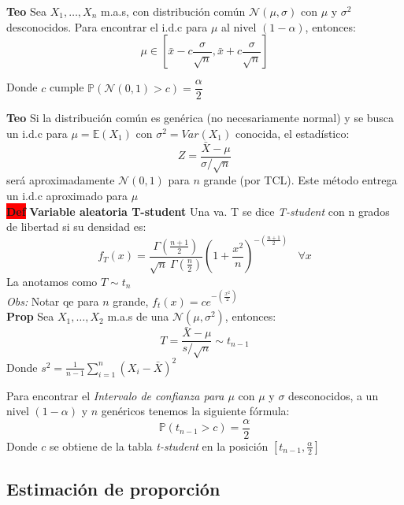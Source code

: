 \documentclass[letterpaper,10.5pt,twocolumn]{article} %
\newcommand{\E}{\mathbb{E} }
\newcommand{\Proba}{\mathbb{P} }
\newcommand{\hlc}[2][yellow]{ \colorbox{#1}{#2} }
\newcommand{\Prop}{\hlc[amber]{\bfseries Prop}}
\newcommand{\Def}{\hlc[red]{\bfseries Def}}
\newcommand{\Teo}{\hlc[applegreen]{\bfseries Teo}}
\let\oldfrac=\frac
\renewcommand{\frac}[2]{\ensuremath{\oldfrac{#1}{#2}}}
\begin{document}
\Teo Sea $X_1, \ldots, X_n $ m.a.s, con distribución común $\mathcal{N}(\mu,\sigma) $ con $\mu$ y $\sigma^{2}$ desconocidos. Para encontrar el i.d.c para $\mu$ al nivel $(1-\alpha)$, entonces:
\begin{equation*}
     \mu \in \left[\bar{x} - c \frac{\sigma}{\sqrt{n}}, \bar{x} + c \frac{\sigma}{\sqrt{n}} \right]
\end{equation*} 

Donde $c$ cumple $\Proba(\mathcal{N}(0,1)>c) = \dfrac{\alpha}{2} $

\Teo Si la distribución común es genérica (no necesariamente normal) y se busca un i.d.c para $\mu=\E(X_1) $ con $\sigma^2=Var(X_1) $ conocida, el estadístico:
\begin{equation*}
    Z = \frac{\bar{X} - \mu}{\sigma/\sqrt{n}}
\end{equation*}
será aproximadamente $\mathcal{N}(0,1) $ para $n$ grande (por TCL). Este método entrega un i.d.c aproximado para $\mu$\\

\Def \textbf{Variable aleatoria T-student} Una va. T se dice \textit{T-student} con n grados de libertad si su densidad es:
\begin{equation*}
	f_T(x) = \dfrac{\Gamma \left(\frac{n+1}{2}\right)}{\sqrt{n}\ \Gamma \left(\frac{n}{2}\right)} \left(1 + \dfrac{x^2}{n}\right)^{-(\frac{n+1}{2})} \ \ \ \ \forall x
\end{equation*}
La anotamos como $T\sim t_n $\\
\textit{Obs:} Notar qe para $n$ grande, $f_{t}(x) = c e^{-\left(\frac{x^2}{2}\right)}$\\

\Prop Sea $X_1, \ldots, X_2 $ m.a.s de una $\mathcal{N}(\mu, \sigma^2) $, entonces:
\begin{equation*}
	T = \frac{\bar{X} - \mu}{s/\sqrt{n}} \sim t_{n-1}
\end{equation*}
Donde $s^2 = \frac{1}{n-1} \sum_{i=1}^{n} (X_i - \bar{X})^2 $

Para encontrar el \textit{Intervalo de confianza para $\mu$} con $\mu$ y $\sigma$ desconocidos, a un nivel $(1-\alpha)$ y $n$ genéricos tenemos la siguiente fórmula:
\begin{equation*}
	\Proba(t_{n-1} > c) = \frac{\alpha}{2}
\end{equation*}
Donde $c$ se obtiene de la tabla \textit{t-student} en la posición $[t_{n-1}, \frac{\alpha}{2} ]$

\subsection*{Estimación de proporción}
\end{document}
